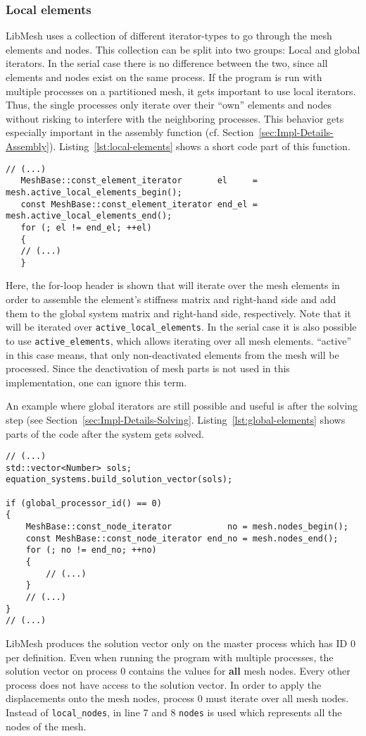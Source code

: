   
  \subsubsection{Local elements}\label{sec:Impl-Parallel-Local}
   LibMesh uses a collection of different iterator-types to go through the mesh elements and nodes. This collection can be split into two groups: Local and global iterators. In the serial case there is no difference between the two, since all elements and nodes exist on the same process. If the program is run with multiple processes on a partitioned mesh, it gets important to use local iterators. Thus, the single processes only iterate over their ``own'' elements and nodes without risking to interfere with the neighboring processes. This behavior gets especially important in the assembly function (cf. Section~\ref{sec:Impl-Details-Assembly}). Listing~\ref{lst:local-elements} shows a short code part of this function.
   \begin{lstlisting}[caption=Local elements iterator,label=lst:local-elements,keepspaces=true]
   // (...)
   MeshBase::const_element_iterator       el     = mesh.active_local_elements_begin();
   const MeshBase::const_element_iterator end_el = mesh.active_local_elements_end();
   for (; el != end_el; ++el)
   {
   // (...)
   }
   \end{lstlisting}
   Here, the for-loop header is shown that will iterate over the mesh elements in order to assemble the element's stiffness matrix and right-hand side and add them to the global system matrix and right-hand side, respectively. Note that it will be iterated over \texttt{active\_local\_elements}. In the serial case it is also possible to use \texttt{active\_elements}, which allows iterating over all mesh elements. ``active'' in this case means, that only non-deactivated elements from the mesh will be processed. Since the deactivation of mesh parts is not used in this implementation, one can ignore this term.

   An example where global iterators are still possible and useful is after the solving step (see Section~\ref{sec:Impl-Details-Solving}. Listing~\ref{lst:global-elements} shows parts of the code after the system gets solved.
\begin{lstlisting}[caption=Global nodes iterator,label=lst:global-elements,keepspaces=true]
// (...)
std::vector<Number> sols;
equation_systems.build_solution_vector(sols);

if (global_processor_id() == 0)
{
	MeshBase::const_node_iterator           no = mesh.nodes_begin();
	const MeshBase::const_node_iterator end_no = mesh.nodes_end();
	for (; no != end_no; ++no)
	{
		// (...)
	}
	// (...)
}
// (...)
\end{lstlisting}
   LibMesh produces the solution vector only on the master process which has ID 0 per definition. Even when running the program with multiple processes, the solution vector on process 0 contains the values for \textbf{all} mesh nodes. Every other process does not have access to the solution vector. In order to apply the displacements onto the mesh nodes, process 0 must iterate over all mesh nodes. Instead of \texttt{local\_nodes}, in line 7 and 8 \texttt{nodes} is used which represents all the nodes of the mesh.
  
